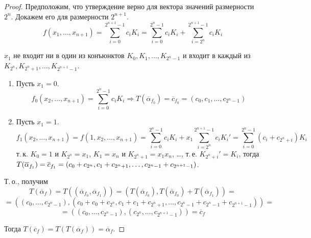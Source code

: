 \begin{enumerate}
\begin{proof}
		\indstep Предположим, что утверждение верно для вектора значений размерности $2^n$.
		Докажем его для размерности $2^{n+1}$.
		\begin{equation*}
		f(x_1, \ldots, x_{n+1}) =
		\sum_{i=0}^{2^{n+1} - 1} c_i K_i =
		\sum_{i=0}^{2^n - 1} c_i K_i + \sum_{i=2^n}^{2^{n+1} - 1} c_i K_i
		\end{equation*}
		
		$x_1$ не входит ни в один из конъюнктов $K_0, K_1, \ldots, K_{2^n - 1}$ и входит в каждый из $K_{2^n}, K_{2^n + 1}, \ldots, \allowbreak K_{2^{n+1} - 1}$.
		\begin{enumerate}
			\item Пусть $x_1 = 0$.
			\begin{equation*}
			f_0(x_2, \ldots, x_{n+1}) = \sum_{i=0}^{2^n - 1} c_i K_i \Rightarrow
			T(\overline\alpha_{f_0}) = \overline c_{f_0} = (c_0, c_1, \ldots, c_{2^n - 1})
			\end{equation*}
			
			\item Пусть $x_1 = 1$.
			\begin{equation*}
			f_1(x_2, \ldots, x_{n+1}) =
			f(1, x_2, \ldots, x_{n+1}) =			
			\sum_{i=0}^{2^n - 1} c_i K_i + x_1 \sum_{i=2^n}^{2^{n+1} - 1} c_i K_i' =
			\sum_{i=0}^{2^n - 1} (c_i + c_{2^n + i}) K_i
			\end{equation*}
			т.\,к. $K_0 = 1$ и $K_{2^n} = x_1$, $K_1 = x_n$ и $K_{2^n + 1} = x_1 x_n$, \ldots, т.\,е. $K_{2^n + i}' = K_i$, тогда $T(\overline\alpha_{f_1}) \opbr= \overline c_{f_1} \opbr= (c_0 + c_{2^n}, c_1 + c_{2^n + 1}, \ldots, c_{2^n - 1} + c_{2^{n+1} - 1})$.
		\end{enumerate}
		
		Т.\,о., получим
		\begin{equation*}
		T(\overline\alpha_f) =
		T((\overline\alpha_{f_0}, \overline\alpha_{f_1})) =
		(T(\overline\alpha_{f_0}), T(\overline\alpha_{f_0}) + T(\overline\alpha_{f_1})) =
		\end{equation*}
		\begin{equation*}
		= ((c_0, \ldots, c_{2^n - 1}), (c_0 + c_0 + c_{2^n}, c_1 + c_1 + c_{2^n + 1}, \ldots, c_{2^n - 1} + c_{2^n - 1} + c_{2^{n+1} - 1})) =
		\end{equation*}
		\begin{equation*}
		= ((c_0, \ldots, c_{2^n - 1}), (c_{2^n}, \ldots, c_{2^{n+1} - 1})) =
		\overline c_f
		\end{equation*}
		\indend
		
	Тогда $T(\overline c_f) = T(T(\overline\alpha_f)) = \overline\alpha_f$.
	\end{proof}
\end{enumerate}